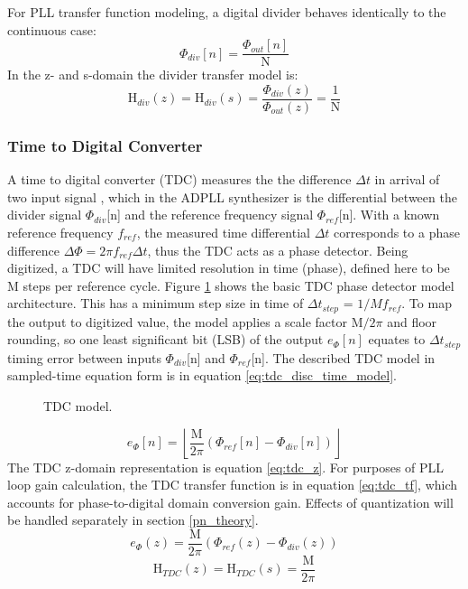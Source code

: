 	For PLL transfer function modeling, a digital divider behaves identically to the continuous case:
	\begin{equation}
		\Phi_{div}[n] = \frac{\Phi_{out}[n]}{\mathrm{N}}
	\end{equation}
	In the z- and s-domain the divider transfer model is:
	\begin{equation}
		\mathrm{H}_{div}(z) = \mathrm{H}_{div}(s) = \frac{\Phi_{div}(z)}{\Phi_{out}(z)} = \frac{1}{\mathrm{N}}
	\end{equation}

\subsubsection{Time to Digital Converter}
	A time to digital converter (TDC) measures the the difference $\Delta t$ in arrival of two input signal \cite{machado_cabral_alves_2019}, which in the ADPLL synthesizer is the differential between the divider signal $\Phi_{div}$[n] and the reference frequency signal $\Phi_{ref}$[n]. With a known reference frequency $f_{ref}$, the measured time differential $\Delta t$ corresponds to a phase difference $\Delta\Phi=2\pi f_{ref}\Delta t$, thus the TDC acts as a phase detector. Being digitized, a TDC will have limited resolution in time (phase), defined here to be M steps per reference cycle. Figure \ref{fig:tdc} shows the basic TDC phase detector model architecture. This has a minimum step size in time of $\Delta t_{step}$ = $1/Mf_{ref}$. To map the output to digitized value, the model applies a scale factor M$/2\pi$ and floor rounding, so one least significant bit (LSB) of the output $e_\Phi[n]$ equates to $\Delta t_{step}$ timing error between inputs $\Phi_{div}$[n] and $\Phi_{ref}$[n]. The described TDC model in sampled-time equation form is in equation \ref{eq:tdc_disc_time_model}.


	\begin{figure}[htb!]
		\center
		\caption{TDC model.}
		\label{fig:tdc}
	\end{figure}
	\FloatBarrier
	\begin{equation}\label{eq:tdc_disc_time_model}
		e_\Phi[n] = \left\lfloor\frac{\mathrm{M}}{2\pi}(\Phi_{ref}[n] - \Phi_{div}[n])\right\rfloor
	\end{equation}
	The TDC z-domain representation is equation \ref{eq:tdc_z}. For purposes of PLL loop gain calculation, the TDC transfer function is in equation \ref{eq:tdc_tf}, which accounts for phase-to-digital domain conversion gain. Effects of quantization will be handled separately in section \ref{pn_theory}.
	\begin{equation}\label{eq:tdc_z}
		e_\Phi(z) = \frac{\mathrm{M}}{2\pi}(\Phi_{ref}(z) - \Phi_{div}(z))
	\end{equation}	
	\begin{equation}\label{eq:tdc_tf}
		\mathrm{H}_{TDC}(z) = \mathrm{H}_{TDC}(s) = \frac{\mathrm{M}}{2\pi}
	\end{equation}	
	\FloatBarrier

